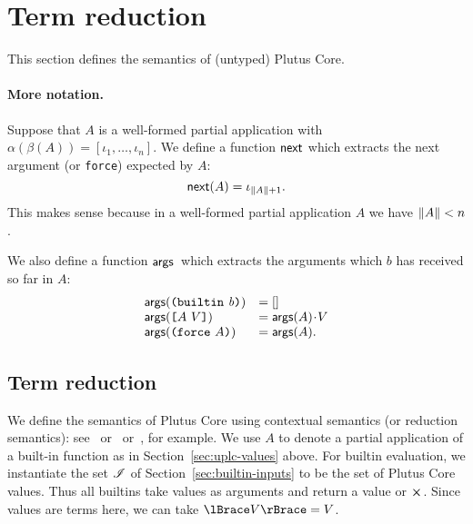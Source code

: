\section{Term reduction}
\label{sec:reduction}

This section defines the semantics of (untyped) Plutus Core.




\paragraph{More notation.} Suppose that $A$ is a well-formed partial application with
$\alpha(\beta(A)) = [\iota_1,\ldots,\iota_n]$.  We define a function $\operatorname{\mathsf{next}}$
which extracts the next argument (or \texttt{force}) expected by $A$:
$$
    \operatorname{\mathsf{next}}(A) = \iota_{\lVert A \rVert+1}.
$$
\noindent%
This makes sense because in a well-formed partial application $A$ we have
$\lVert A \rVert < n$.

\medskip
\noindent We also define a function $\operatorname{\mathbf{\mathsf{args}}}{}$ which extracts the arguments which
$b$ has received so far in $A$:
$$
\begin{array}{ll}
  \operatorname{\mathbf{\mathsf{args}}}(\texttt{(} \texttt{builtin} ~ \mathit{b} \texttt{)}) &= []\\
  \operatorname{\mathbf{\mathsf{args}}}(\texttt{[} A ~ V \texttt{]}) &= \operatorname{\mathbf{\mathsf{args}}}(A)\mathbin{\!\cdot\!} V\\
  \operatorname{\mathbf{\mathsf{args}}}(\texttt{(} \texttt{force} ~ A \texttt{)})   &= \operatorname{\mathbf{\mathsf{args}}}(A).\\
\end{array}
$$%

\subsection{Term reduction}

    
We define the semantics of Plutus Core using contextual semantics (or reduction
semantics): see~\cite{Felleisen-Hieb} or~\cite{Felleisen-Semantics-Engineering}
or~\cite[5.3]{Harper:PFPL}, for example.  We use $A$ to denote a partial
application of a built-in function as in Section~\ref{sec:uplc-values} above.
For builtin evaluation, we instantiate the set $\mathscr{I}$ of
Section~\ref{sec:builtin-inputs} to be the set of Plutus Core values.  Thus all
builtins take values as arguments and return a value or $\errorX$.  Since values
are terms here, we can take $\reify{V} = V$.

